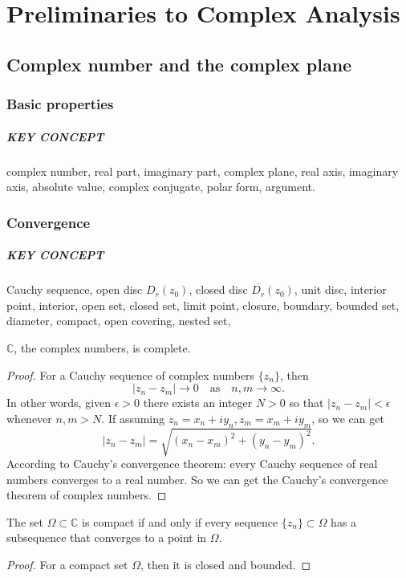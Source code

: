 \chapter{Preliminaries to Complex Analysis}

\section{Complex number and the complex plane}

\subsection{Basic properties}
\paragraph{KEY CONCEPT}
complex number, real part, imaginary part,
complex plane, real axis, imaginary axis,
absolute value, complex conjugate,
polar form, argument.

\subsection{Convergence}
\paragraph{KEY CONCEPT}
Cauchy sequence, open disc $D_r(z_0)$, closed disc $\overline{D_r}(z_0)$,
unit disc, interior point, interior, open set, closed set, limit point,
closure, boundary, bounded set, diameter, compact, open covering, nested set,

\begin{theorem}
    $\mathbb{C}$, the complex numbers, is complete.
\end{theorem}
\begin{proof}
    For a Cauchy sequence of complex numbers $\{z_n\}$, then
    \[
        |z_n-z_m|\to 0 \quad\text{as}\quad n,m\to\infty.
    \]
    In other words, given $\epsilon>0$ there exists an
    integer $N>0$ so that $|z_n-z_m|<\epsilon$ whenever $n,m>N$.
    If assuming $z_n=x_n+iy_n, z_m=x_m+iy_m$, so we can get
    \[
        |z_n-z_m|=\sqrt{(x_n-x_m)^2+(y_n-y_m)^2}.
    \]
    According to Cauchy's convergence theorem: every Cauchy sequence
    of real numbers converges to a real number. So we can get the Cauchy's
    convergence theorem of complex numbers.
\end{proof}

\begin{theorem}
    The set $\Omega\subset \mathbb{C}$ is compact if and only if every sequence
    $\{z_n\}\subset \Omega$ has a subsequence that converges to a point in $\Omega$.
\end{theorem}
\begin{proof}
	For a compact set $\Omega$, then it is closed and bounded.
\end{proof}

